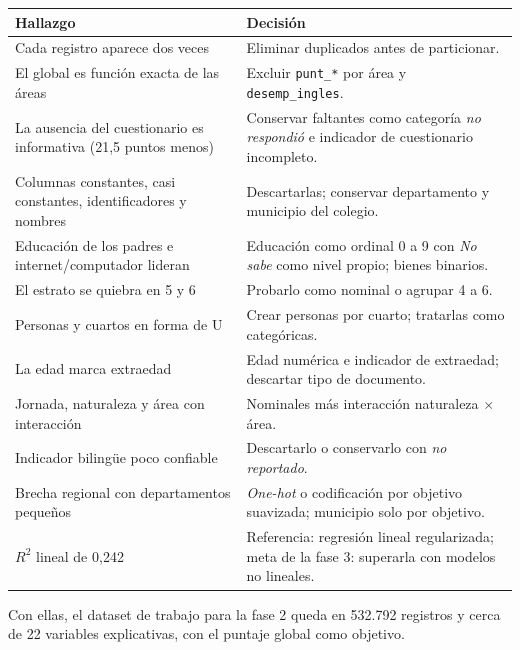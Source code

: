         \clearpage
        \begin{strip}
            \centering
            \label{decisions}
            \small
            \begin{tabular}{|L{7cm}|L{9cm}|}
                \hline
                \textbf{Hallazgo} & \textbf{Decisión} \\
                \hline
                Cada registro aparece dos veces & Eliminar duplicados antes de particionar. \\
                \hline
                El global es función exacta de las áreas & Excluir \texttt{punt\_*} por área y \texttt{desemp\_ingles}. \\
                \hline
                La ausencia del cuestionario es informativa (21,5 puntos menos) & Conservar faltantes como categoría \textit{no respondió} e indicador de cuestionario incompleto. \\
                \hline
                Columnas constantes, casi constantes, identificadores y nombres & Descartarlas; conservar departamento y municipio del colegio. \\
                \hline
                Educación de los padres e internet/computador lideran & Educación como ordinal 0 a 9 con \textit{No sabe} como nivel propio; bienes binarios. \\
                \hline
                El estrato se quiebra en 5 y 6 & Probarlo como nominal o agrupar 4 a 6. \\
                \hline
                Personas y cuartos en forma de U & Crear personas por cuarto; tratarlas como categóricas. \\
                \hline
                La edad marca extraedad & Edad numérica e indicador de extraedad; descartar tipo de documento. \\
                \hline
                Jornada, naturaleza y área con interacción & Nominales más interacción naturaleza $\times$ área. \\
                \hline
                Indicador bilingüe poco confiable & Descartarlo o conservarlo con \textit{no reportado}. \\
                \hline
                Brecha regional con departamentos pequeños & \textit{One-hot} o codificación por objetivo suavizada; municipio solo por objetivo. \\
                \hline
                $R^2$ lineal de 0,242 & Referencia: regresión lineal regularizada; meta de la fase 3: superarla con modelos no lineales. \\
                \hline
            \end{tabular}
        \end{strip}
        

        Con ellas, el dataset de trabajo para la fase 2 queda en 532.792 
        registros y cerca de 22 variables explicativas, con el puntaje 
        global como objetivo.